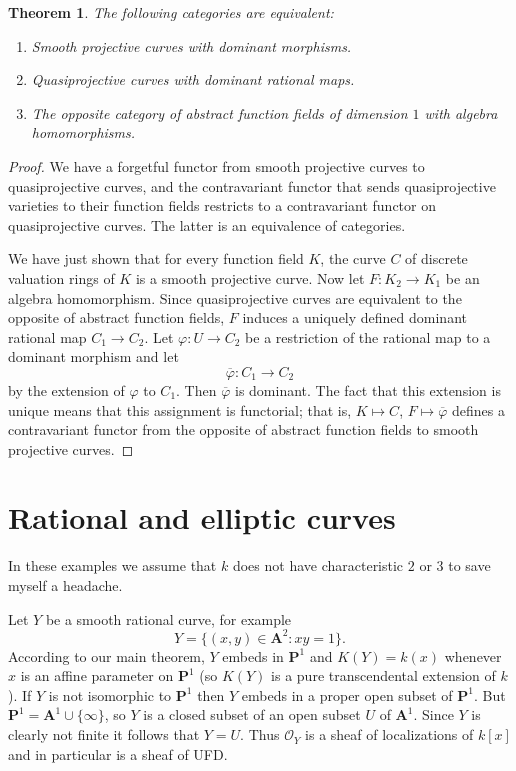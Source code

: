 \documentclass[reqno,12pt,letterpaper]{amsart}
\newcommand{\PP}{\mathbf P}
\newcommand{\Aff}{\mathbf A}
\newcommand{\Olo}{\mathscr O}
\newtheorem{theorem}{Theorem}[section]
\theoremstyle{definition}
\begin{document}
\begin{theorem}
The following categories are equivalent:
\begin{enumerate}
\item Smooth projective curves with dominant morphisms.
\item Quasiprojective curves with dominant rational maps.
\item The opposite category of abstract function fields of dimension $1$ with algebra homomorphisms.
\end{enumerate}
\end{theorem}
\begin{proof}
We have a forgetful functor from smooth projective curves to quasiprojective curves, and the contravariant functor that sends quasiprojective varieties to their function fields restricts to a contravariant functor on quasiprojective curves.
The latter is an equivalence of categories.

We have just shown that for every function field $K$, the curve $C$ of discrete valuation rings of $K$ is a smooth projective curve.
Now let $F: K_2 \to K_1$ be an algebra homomorphism.
Since quasiprojective curves are equivalent to the opposite of abstract function fields, $F$ induces a uniquely defined dominant rational map $C_1 \to C_2$.
Let $\varphi: U \to C_2$ be a restriction of the rational map to a dominant morphism and let
$$\overline \varphi: C_1 \to C_2$$
by the extension of $\varphi$ to $C_1$.
Then $\overline \varphi$ is dominant. The fact that this extension is unique means that this assignment is functorial; that is, $K \mapsto C$, $F \mapsto \overline \varphi$ defines a contravariant functor from the opposite of abstract function fields to smooth projective curves.
\end{proof}

\section{Rational and elliptic curves}
In these examples we assume that $k$ does not have characteristic $2$ or $3$ to save myself a headache.

Let $Y$ be a smooth rational curve, for example
$$Y = \{(x, y) \in \Aff^2: xy = 1\}.$$
According to our main theorem, $Y$ embeds in $\PP^1$ and $K(Y) = k(x)$ whenever $x$ is an affine parameter on $\PP^1$ (so $K(Y)$ is a pure transcendental extension of $k$).
If $Y$ is not isomorphic to $\PP^1$ then $Y$ embeds in a proper open subset of $\PP^1$.
But $\PP^1 = \Aff^1 \cup \{\infty\}$, so $Y$ is a closed subset of an open subset $U$ of $\Aff^1$.
Since $Y$ is clearly not finite it follows that $Y = U$.
Thus $\Olo_Y$ is a sheaf of localizations of $k[x]$ and in particular is a sheaf of UFD.
\end{document}

